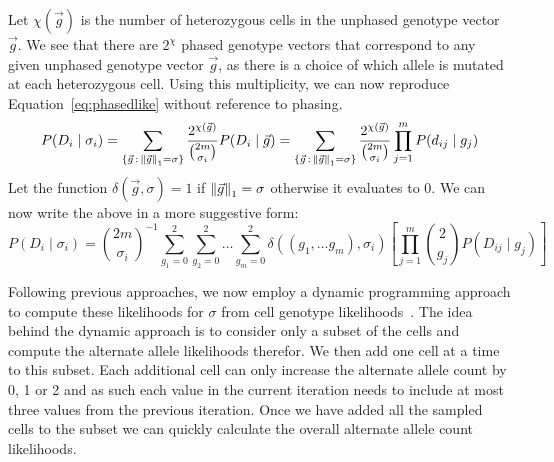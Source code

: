 \documentclass[../../main.tex]{subfiles}
\begin{document}
Let $\chi(\vec{g})$ is the number of heterozygous cells in the unphased genotype vector $\vec{g}$.
We see that there are $2^\chi$ phased genotype vectors that correspond to any given unphased genotype vector $\vec{g}$, as there is a choice of which allele is mutated at each heterozygous cell.
Using this multiplicity, we can now reproduce Equation~\eqref{eq:phasedlike} without reference to phasing.
\begin{equation*}
P(D_i\mid\sigma_i) = \sum_{\{\vec{g}\, : \, \left\lVert\vec{g}\right\rVert_1=\sigma \}} \frac{2^{\chi(\vec{g})}}{\binom{2m}{\sigma_i}} P(D_i\mid\vec{g}) = \sum_{\{\vec{g}\, : \, \left\lVert\vec{g}\right\rVert_1=\sigma \}} \frac{2^{\chi(\vec{g})}}{\binom{2m}{\sigma_i}} \prod_{j=1}^{m}P(d_{ij}\mid g_{j})
\end{equation*}
Let the function $\delta(\vec{g},\sigma) = 1$ if $\left\lVert\vec{g}\right\rVert_1=\sigma$ otherwise it evaluates to 0.
We can now write the above in a more suggestive form:
\begin{equation}\label{eq:sitelikelihood}
P(D_i\mid\sigma_i) = \binom{2m}{\sigma_i}^{-1}\sum_{g_1=0}^2\sum_{g_2=0}^2\dots\sum_{g_m=0}^2 \delta((g_1,\dots g_m),\sigma_i)\left[\prod_{j=1}^{m}\binom{2}{g_j}P(D_{ij}\mid g_{j})\right]
\end{equation}

Following previous approaches, we now employ a dynamic programming approach to compute these likelihoods for $\sigma$ from cell genotype likelihoods~\cite{listatistical, monovar, sciphi, ledurbin}.
The idea behind the dynamic approach is to consider only a subset of the cells and compute the alternate allele likelihoods therefor.
We then add one cell at a time to this subset.
Each additional cell can only increase the alternate allele count by 0, 1 or 2 and as such each value in the current iteration needs to include at most three values from the previous iteration.
Once we have added all the sampled cells to the subset we can quickly calculate the overall alternate allele count likelihoods.
\end{document}
